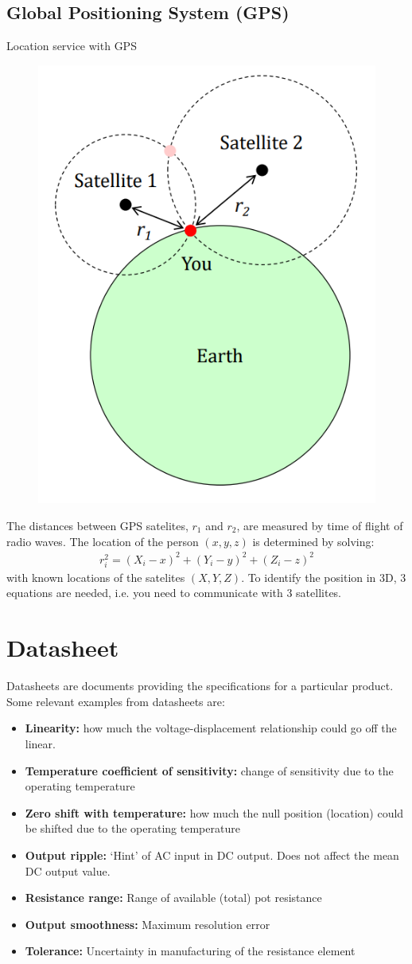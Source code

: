 \documentclass[class=report, crop=false, 12pt,a4paper]{standalone}
\begin{document}
\subsection{Global Positioning System (GPS)}
Location service with GPS
\begin{figure}[H]
  \centering
  \includegraphics[width = 0.35 \textwidth]{../img/Mdiagram21.PNG}
\end{figure}
The distances between GPS satelites, $r_1$ and $r_2$, are measured by time of flight of radio waves. The location of the person $(x,y,z)$ is determined by solving:
\begin{gather}
  r_i^2 = (X_i-x)^2+(Y_i-y)^2+(Z_i-z)^2
\end{gather}
with known locations of the satelites $(X,Y,Z)$. To identify the position in 3D, 3 equations are needed, i.e. you need to communicate with 3 satellites.
\section{Datasheet}
Datasheets are documents providing the specifications for a particular product. Some relevant examples from datasheets are:
\begin{itemize}
  \item \textbf{Linearity:} how much the voltage-displacement relationship could go off the linear.
  \item \textbf{Temperature coefficient of sensitivity:} change of sensitivity due to the operating temperature
  \item \textbf{Zero shift with temperature:} how much the null position (location) could be shifted due to the operating temperature
  \item \textbf{Output ripple:} ‘Hint’ of AC input in DC output. Does not affect the mean DC output value.
  \item \textbf{Resistance range:} Range of available (total) pot resistance
  \item \textbf{Output smoothness:} Maximum resolution error
  \item \textbf{Tolerance:} Uncertainty in manufacturing of the resistance element
\end{itemize}
\end{document}
